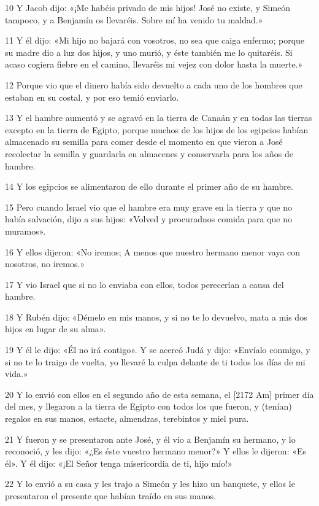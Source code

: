 \par 10 Y Jacob dijo: «¡Me habéis privado de mis hijos! José no existe, y Simeón tampoco, y a Benjamín os llevaréis. Sobre mí ha venido tu maldad.»
\par 11 Y él dijo: «Mi hijo no bajará con vosotros, no sea que caiga enfermo; porque su madre dio a luz dos hijos, y uno murió, y éste también me lo quitaréis. Si acaso cogiera fiebre en el camino, llevaréis mi vejez con dolor hasta la muerte.»
\par 12 Porque vio que el dinero había sido devuelto a cada uno de los hombres que estaban en su costal, y por eso temió enviarlo.
\par 13 Y el hambre aumentó y se agravó en la tierra de Canaán y en todas las tierras excepto en la tierra de Egipto, porque muchos de los hijos de los egipcios habían almacenado su semilla para comer desde el momento en que vieron a José recolectar la semilla y guardarla en almacenes y conservarla para los años de hambre.
\par 14 Y los egipcios se alimentaron de ello durante el primer año de su hambre.
\par 15 Pero cuando Israel vio que el hambre era muy grave en la tierra y que no había salvación, dijo a sus hijos: «Volved y procuradnos comida para que no muramos».
\par 16 Y ellos dijeron: «No iremos; A menos que nuestro hermano menor vaya con nosotros, no iremos.»
\par 17 Y vio Israel que si no lo enviaba con ellos, todos perecerían a causa del hambre.
\par 18 Y Rubén dijo: «Démelo en mis manos, y si no te lo devuelvo, mata a mis dos hijos en lugar de su alma».
\par 19 Y él le dijo: «Él no irá contigo». Y se acercó Judá y dijo: «Envíalo conmigo, y si no te lo traigo de vuelta, yo llevaré la culpa delante de ti todos los días de mi vida.»
\par 20 Y lo envió con ellos en el segundo año de esta semana, el [2172 Am] primer día del mes, y llegaron a la tierra de Egipto con todos los que fueron, y (tenían) regalos en sus manos, estacte, almendras, terebintos y miel pura.
\par 21 Y fueron y se presentaron ante José, y él vio a Benjamín su hermano, y lo reconoció, y les dijo: «¿Es éste vuestro hermano menor?» Y ellos le dijeron: «Es él». Y él dijo: «¡El Señor tenga misericordia de ti, hijo mío!»
\par 22 Y lo envió a su casa y les trajo a Simeón y les hizo un banquete, y ellos le presentaron el presente que habían traído en sus manos.

